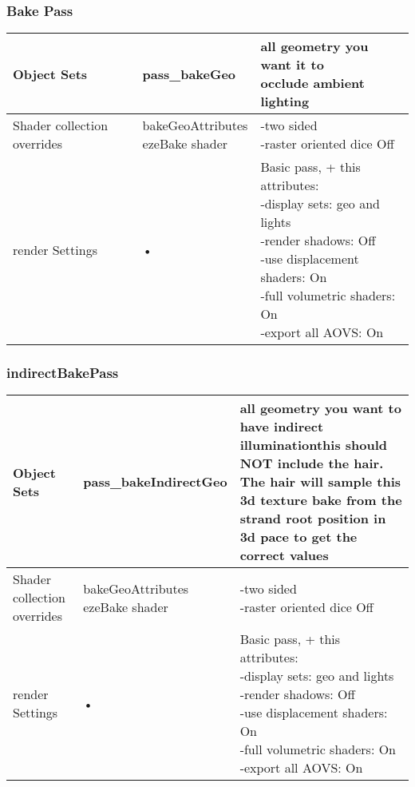 \documentclass[final,letterpaper,twoside,12pt]{report}
\begin{document}
\smallskip
\subsubsection {Bake Pass}
\footnotesize
\begin{tabular}{|l|l|l|}
\hline 
Object Sets & pass\_bakeGeo & \parbox[t]{5cm}{all geometry you want it to\\
occlude ambient lighting\\}\\
\hline
Shader collection overrides & \parbox[t]{5cm}{bakeGeoAttributes\\
ezeBake shader}
 & \parbox[t]{5cm}{-two sided\\
-raster oriented dice Off}\\
\hline 
render Settings & • & 
\parbox[t]{5cm}{Basic pass, + this attributes:\\
-display sets: geo and lights\\
-render shadows: Off\\
-use displacement shaders: On\\
-full volumetric shaders: On\\
-export all AOVS: On\\}
\\ 
\hline 
\end{tabular} 
\smallskip




\subsubsection {indirectBakePass}
\footnotesize
\begin{tabular}{|l|l|l|}
\hline 
Object Sets & pass\_bakeIndirectGeo & \parbox[t]{5cm}{all geometry you want to have
indirect illuminationthis should NOT include the hair.  The hair will sample this 3d
texture bake from the strand root
 position in 3d pace to get the correct values}\\
\hline
Shader collection overrides & \parbox[t]{5cm}{bakeGeoAttributes\\
ezeBake shader}
 & \parbox[t]{5cm}{-two sided\\
-raster oriented dice Off}\\
\hline 
render Settings & • & 
\parbox[t]{5cm}{Basic pass, + this attributes:\\
-display sets: geo and lights\\
-render shadows: Off\\
-use displacement shaders: On\\
-full volumetric shaders: On\\
-export all AOVS: On\\}
\\ 
\hline 
\end{tabular} 
\smallskip
\end{document}
